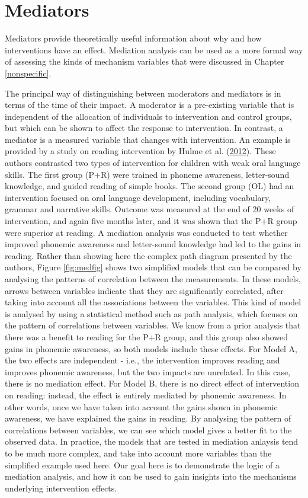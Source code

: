 \documentclass{krantz}
\begin{document}
\hypertarget{mediators-1}{%
\section{Mediators}\label{mediators-1}}

Mediators provide theoretically useful information about why and how interventions have an effect. Mediation analysis can be used as a more formal way of assessing the kinds of mechanism variables that were discussed in Chapter \ref{nonspecific}.

The principal way of distinguishing between moderators and mediators is in terms of the time of their impact. A moderator is a pre-existing variable that is independent of the allocation of individuals to intervention and control groups, but which can be shown to affect the response to intervention. In contrast, a mediator is a measured variable that changes with intervention. An example is provided by a study on reading intervention by Hulme et al. (\protect\hyperlink{ref-hulme2012}{2012}). These authors contrasted two types of intervention for children with weak oral language skills. The first group (P+R) were trained in phoneme awareness, letter-sound knowledge, and guided reading of simple books. The second group (OL) had an intervention focused on oral language development, including vocabulary, grammar and narrative skills. Outcome was measured at the end of 20 weeks of intervention, and again five months later, and it was shown that the P+R group were superior at reading. A mediation analysis was conducted to test whether improved phonemic awareness and letter-sound knowledge had led to the gains in reading. Rather than showing here the complex path diagram presented by the authors, Figure \ref{fig:medfig} shows two simplified models that can be compared by analysing the patterns of correlation between the measurements. In these models, arrows between variables indicate that they are significantly correlated, after taking into account all the associations between the variables. This kind of model is analysed by using a statistical method such as path analysis, which focuses on the pattern of correlations between variables. We know from a prior analysis that there was a benefit to reading for the P+R group, and this group also showed gains in phonemic awareness, so both models include these effects. For Model A, the two effects are independent - i.e., the intervention improves reading and improves phonemic awareness, but the two impacts are unrelated. In this case, there is no mediation effect. For Model B, there is no direct effect of intervention on reading: instead, the effect is entirely mediated by phonemic awareness. In other words, once we have taken into account the gains shown in phonemic awareness, we have explained the gains in reading. By analysing the pattern of correlations between variables, we can see which model gives a better fit to the observed data. In practice, the models that are tested in mediation anlaysis tend to be much more complex, and take into account more variables than the simplified example used here. Our goal here is to demonstrate the logic of a mediation analysis, and how it can be used to gain insights into the mechanisms underlying intervention effects.
\end{document}
